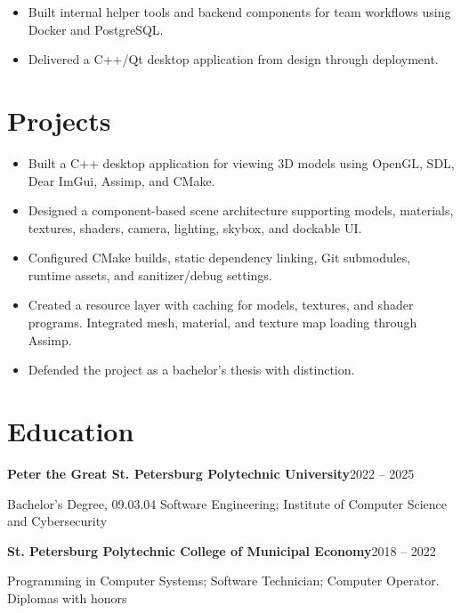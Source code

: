 \begin{itemize}
  \item Built internal helper tools and backend components for team workflows using Docker and PostgreSQL.
\end{itemize}

\begin{itemize}
  \item Delivered a C++/Qt desktop application from design through deployment.
\end{itemize}

\section*{Projects}

\begin{itemize}
  \item Built a C++ desktop application for viewing 3D models using OpenGL, SDL, Dear ImGui, Assimp, and CMake.
  \item Designed a component-based scene architecture supporting models, materials, textures, shaders, camera, lighting, skybox, and dockable UI.
  \item Configured CMake builds, static dependency linking, Git submodules, runtime assets, and sanitizer/debug settings.
  \item Created a resource layer with caching for models, textures, and shader programs. Integrated mesh, material, and texture map loading through Assimp.
  \item Defended the project as a bachelor's thesis with distinction.
\end{itemize}

\section*{Education}

\textbf{Peter the Great St. Petersburg Polytechnic University}\hfill 2022 -- 2025\par
Bachelor's Degree, 09.03.04 Software Engineering; Institute of Computer Science and Cybersecurity\par
\tightvspace
\textbf{St. Petersburg Polytechnic College of Municipal Economy}\hfill 2018 -- 2022\par
Programming in Computer Systems; Software Technician; Computer Operator. Diplomas with honors
